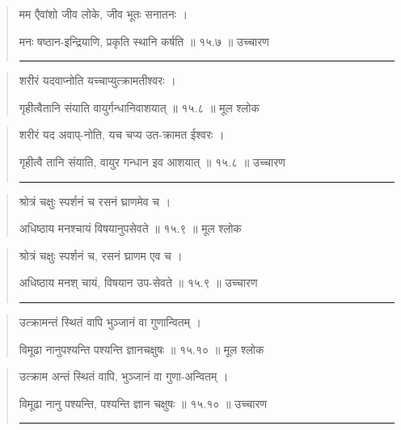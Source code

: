 \begin{quotation}

मम एैवांशो जीव लोके, जीव भूतः सनातनः  ।  

मनः षष्ठान-इन्द्रियाणि, प्रकृति स्थानि कर्षति  ॥ १५.७ ॥  उच्चारण

\noindent\rule{16cm}{0.4pt} 
\end{quotation}


\begin{quotation}

शरीरं यदवाप्नोति यच्चाप्युत्क्रामतीश्वरः  ।  

गृहीत्वैतानि संयाति वायुर्गन्धानिवाशयात्‌  ॥ १५.८ ॥  मूल श्लोक
\end{quotation}

\begin{quotation}

शरीरं यद अवाप्-नोति,  यच चप्य उत-क्रामत ईश्वरः  ।  

गृहीत्वै तानि संयाति, वायुर गन्धान इव आशयात्‌  ॥ १५.८ ॥  उच्चारण

\noindent\rule{16cm}{0.4pt} 
\end{quotation}


\begin{quotation}

श्रोत्रं चक्षुः स्पर्शनं च रसनं घ्राणमेव च  ।  

अधिष्ठाय मनश्चायं विषयानुपसेवते ॥ १५.९ ॥  मूल श्लोक
\end{quotation}

\begin{quotation}

श्रोत्रं चक्षुः स्पर्शनं च, रसनं घ्राणम एव च  ।  

अधिष्ठाय मनश् चायं, विषयान उप-सेवते  ॥ १५.९ ॥  उच्चारण

\noindent\rule{16cm}{0.4pt} 
\end{quotation}


\begin{quotation}

उत्क्रामन्तं स्थितं वापि भुञ्जानं वा गुणान्वितम्‌  ।  

विमूढा नानुपश्यन्ति पश्यन्ति ज्ञानचक्षुषः  ॥ १५.१० ॥  मूल श्लोक
\end{quotation}

\begin{quotation}

उत्क्राम अन्तं स्थितं वापि, भुञ्जानं वा गुणा-अन्वितम्‌   ।  

विमूढा नानु पश्यन्ति, पश्यन्ति ज्ञान चक्षुषः  ॥ १५.१० ॥  उच्चारण

\noindent\rule{16cm}{0.4pt} 
\end{quotation}


